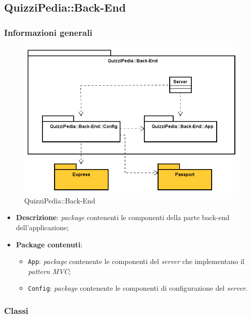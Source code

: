 \subsection{QuizziPedia::Back-End}
\subsubsection{Informazioni generali}
\label{QuizziPedia::Back-End}
\begin{figure}[ht]
	\centering
	\includegraphics[scale=0.7]{UML/Package/QuizziPedia_Back-End.png}
	\caption{QuizziPedia::Back-End}
\end{figure}
\FloatBarrier
	\begin{itemize}
		\item \textbf{Descrizione}:
		\textit{package} contenenti le componenti della parte back-end dell'applicazione;
		\item \textbf{Package contenuti}:
		\begin{itemize}
			\item \texttt{App}:
			\textit{package} contenente le componenti del \textit{server} che implementano il \textit{pattern MVC};
			\item \texttt{Config}:
			\textit{package} contenente le componenti di configurazione del \textit{server}.
		\end{itemize}
	\end{itemize}
\subsubsection{Classi}
